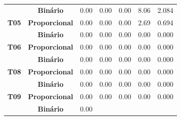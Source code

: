 \begin{table}[htbp]
\begin{tabular}{|c|cccccc|}
		&
		\multicolumn{1}{c|}{\textbf{Binário}} &
		\multicolumn{1}{c|}{0.00} &
		\multicolumn{1}{c|}{0.00} &
		\multicolumn{1}{c|}{0.00} &
		\multicolumn{1}{c|}{8.06} &
		2.084 \\ \cline{2-7} 
		\multirow{-2}{*}{\textbf{T05}} &
		\multicolumn{1}{l|}{\cellcolor[HTML]{F2F2F2}\textbf{Proporcional}} &
		\multicolumn{1}{c|}{\cellcolor[HTML]{F2F2F2}0.00} &
		\multicolumn{1}{c|}{\cellcolor[HTML]{F2F2F2}0.00} &
		\multicolumn{1}{c|}{\cellcolor[HTML]{F2F2F2}0.00} &
		\multicolumn{1}{c|}{\cellcolor[HTML]{F2F2F2}2.69} &
		\cellcolor[HTML]{F2F2F2}0.694 \\ \hline
		&
		\multicolumn{1}{c|}{\textbf{Binário}} &
		\multicolumn{1}{c|}{0.00} &
		\multicolumn{1}{c|}{0.00} &
		\multicolumn{1}{c|}{0.00} &
		\multicolumn{1}{c|}{0.00} &
		0.000 \\ \cline{2-7} 
		\multirow{-2}{*}{\textbf{T06}} &
		\multicolumn{1}{l|}{\cellcolor[HTML]{F2F2F2}\textbf{Proporcional}} &
		\multicolumn{1}{c|}{\cellcolor[HTML]{F2F2F2}0.00} &
		\multicolumn{1}{c|}{\cellcolor[HTML]{F2F2F2}0.00} &
		\multicolumn{1}{c|}{\cellcolor[HTML]{F2F2F2}0.00} &
		\multicolumn{1}{c|}{\cellcolor[HTML]{F2F2F2}0.00} &
		\cellcolor[HTML]{F2F2F2}0.000 \\ \hline
		&
		\multicolumn{1}{c|}{\textbf{Binário}} &
		\multicolumn{1}{c|}{0.00} &
		\multicolumn{1}{c|}{0.00} &
		\multicolumn{1}{c|}{0.00} &
		\multicolumn{1}{c|}{0.00} &
		0.000 \\ \cline{2-7} 
		\multirow{-2}{*}{\textbf{T08}} &
		\multicolumn{1}{l|}{\cellcolor[HTML]{F2F2F2}\textbf{Proporcional}} &
		\multicolumn{1}{c|}{\cellcolor[HTML]{F2F2F2}0.00} &
		\multicolumn{1}{c|}{\cellcolor[HTML]{F2F2F2}0.00} &
		\multicolumn{1}{c|}{\cellcolor[HTML]{F2F2F2}0.00} &
		\multicolumn{1}{c|}{\cellcolor[HTML]{F2F2F2}0.00} &
		\cellcolor[HTML]{F2F2F2}0.000 \\ \hline
		&
		\multicolumn{1}{c|}{\textbf{Binário}} &
		\multicolumn{1}{c|}{0.00} &
		\multicolumn{1}{c|}{0.00} &
		\multicolumn{1}{c|}{0.00} &
		\multicolumn{1}{c|}{0.00} &
		0.000 \\ \cline{2-7} 
		\multirow{-2}{*}{\textbf{T09}} &
		\multicolumn{1}{l|}{\cellcolor[HTML]{F2F2F2}\textbf{Proporcional}} &
		\multicolumn{1}{c|}{\cellcolor[HTML]{F2F2F2}0.00} &
		\multicolumn{1}{c|}{\cellcolor[HTML]{F2F2F2}0.00} &
		\multicolumn{1}{c|}{\cellcolor[HTML]{F2F2F2}0.00} &
		\multicolumn{1}{c|}{\cellcolor[HTML]{F2F2F2}0.00} &
		\cellcolor[HTML]{F2F2F2}0.000 \\ \hline
		&
		\multicolumn{1}{c|}{\textbf{Binário}} &
		\multicolumn{1}{c|}{0.00} &

\end{tabular}
\end{table}
